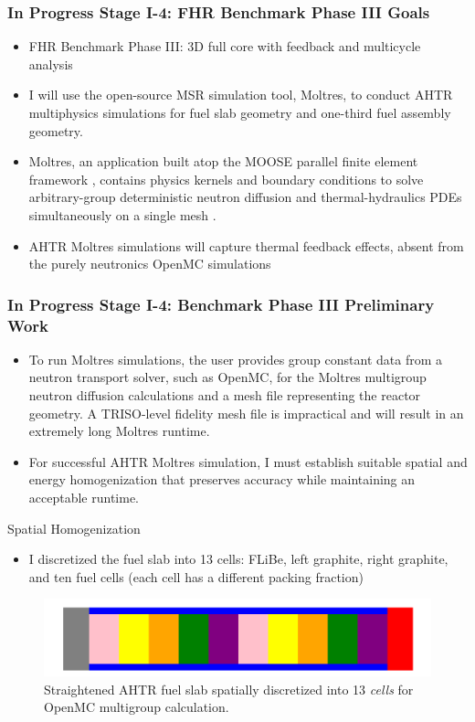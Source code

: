 \begin{frame}
    \frametitle{In Progress Stage I-4: FHR Benchmark Phase III Goals}
    \begin{itemize}
        \item FHR Benchmark Phase III: 3D full core with feedback and multicycle 
        analysis
        \item I will use the open-source MSR simulation tool, Moltres, to conduct
        AHTR multiphysics simulations for fuel slab geometry and one-third 
        fuel assembly geometry. 
        \item Moltres, an application built atop the 
        \gls{MOOSE} parallel finite element framework \cite{gaston_moose:_2009}, 
        contains physics kernels and boundary conditions to solve arbitrary-group 
        deterministic neutron diffusion and thermal-hydraulics \glspl{PDE} 
        simultaneously on a single mesh \cite{lindsay_introduction_2018,park_advancement_2020}. 
        \item AHTR Moltres simulations will capture thermal feedback effects, 
        absent from the purely neutronics OpenMC simulations
    \end{itemize}
\end{frame}

\begin{frame}
    \frametitle{In Progress Stage I-4: Benchmark Phase III Preliminary Work}
    \begin{itemize}
        \item To run Moltres simulations, the user provides group constant data from a neutron 
        transport solver, such as OpenMC, for the Moltres multigroup neutron diffusion 
        calculations and a mesh file representing the reactor geometry. 
        A TRISO-level fidelity mesh file is impractical and will result in an extremely 
        long Moltres runtime. 
        \item For successful AHTR Moltres simulation, I must establish 
        suitable spatial and energy homogenization that preserves accuracy while 
        maintaining an acceptable runtime.
    \end{itemize}
\begin{block}{Spatial Homogenization}
    \begin{itemize}
        \item I discretized the fuel slab into 13 cells: FLiBe, left graphite, right graphite, 
    and ten fuel cells (each cell has a different packing fraction)
    \end{itemize}
    \vspace{-0.3cm}
    \begin{figure}[]
        \includegraphics[width=0.6\linewidth]{../docs/figures/straightened_slab_mg.png}
        \caption{Straightened AHTR fuel slab spatially discretized into 
        13 \textit{cells} for OpenMC multigroup calculation.}
    \end{figure}
\end{block}
\end{frame}

